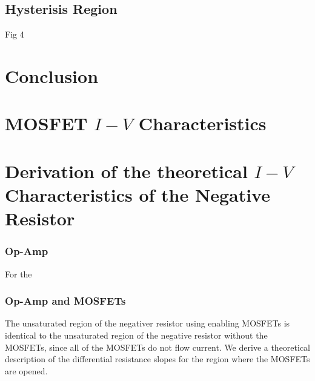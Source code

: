 \documentclass[%
 aip,
amsmath,amssymb,
reprint,
]{revtex4-1}
\begin{document}
\subsection{Hysterisis Region}
Fig 4

\section{\label{sec:Conclusion} Conclusion}

\appendix

\section{\label{mosfetiv}MOSFET $I-V$ Characteristics}

\section{Derivation of the theoretical $I-V$ Characteristics of the Negative Resistor}
\subsubsection{\label{opampiv}Op-Amp}
For the 

\subsubsection{\label{opamp_mosfetiv}Op-Amp and MOSFETs}
The unsaturated region of the negativer resistor using enabling MOSFETs is identical to the unsaturated region of the negative resistor without the MOSFETs, since all of the MOSFETs do not flow current. We derive a theoretical description of the differential resistance slopes for the region where the MOSFETs are opened. 
\end{document}

